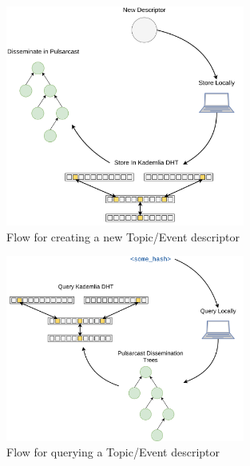 \begin{figure}[hb!]
  \centering
  \includegraphics[width=0.7\textwidth]{img/pulsarcast-descriptor-creation.png}
  \caption{Flow for creating a new Topic/Event descriptor}
  \label{fig:pulsarcast-descriptor-creation}
\end{figure}

\begin{figure}[tb!]
  \centering
  \includegraphics[width=0.7\textwidth]{img/pulsarcast-descriptor-query.png}
  \caption{Flow for querying a Topic/Event descriptor}
  \label{fig:pulsarcast-descriptor-query}
\end{figure}

